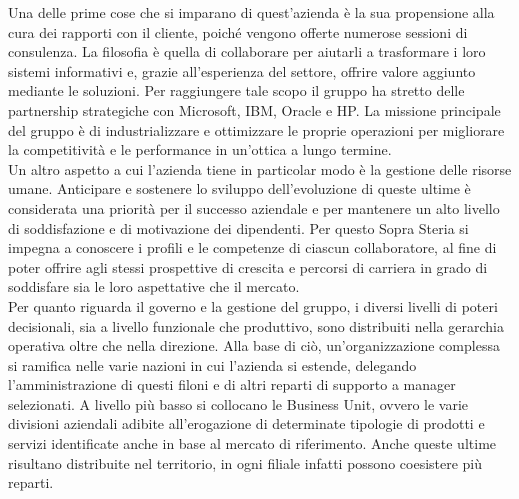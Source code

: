 	Una delle prime cose che si imparano di quest'azienda è la sua propensione alla cura dei rapporti con il cliente, poiché vengono offerte numerose sessioni	di consulenza. La filosofia è quella di collaborare per aiutarli a trasformare i loro sistemi informativi e, grazie all'esperienza del settore, offrire valore aggiunto mediante le soluzioni. Per raggiungere tale scopo il gruppo ha stretto delle partnership strategiche con Microsoft, IBM, Oracle e HP. La missione principale del gruppo è di industrializzare e ottimizzare le proprie operazioni per migliorare la competitività e le performance in un'ottica a lungo termine.\\
	
	Un altro aspetto a cui l'azienda tiene in particolar modo è la gestione delle risorse umane. Anticipare e sostenere lo sviluppo dell'evoluzione di queste ultime è considerata	una priorità per il successo aziendale e per mantenere un alto livello di soddisfazione e di motivazione dei dipendenti. Per questo Sopra Steria si impegna a conoscere i profili e le competenze di ciascun collaboratore, al fine di poter offrire agli stessi prospettive di crescita e percorsi di carriera in grado di soddisfare sia le loro aspettative che il mercato.\\
	
	
	Per quanto riguarda il governo e la gestione del gruppo, i diversi livelli di poteri decisionali, sia a livello funzionale che produttivo, sono distribuiti nella gerarchia operativa oltre che nella direzione. Alla base di ciò, un'organizzazione complessa si ramifica nelle varie nazioni in cui l'azienda si estende, delegando l'amministrazione di questi filoni e di altri reparti di supporto a manager selezionati. A livello più basso si collocano le Business Unit, ovvero le varie divisioni aziendali adibite all'erogazione di determinate tipologie di prodotti e servizi identificate anche in base al mercato di riferimento. Anche queste ultime risultano distribuite nel territorio, in ogni filiale infatti possono coesistere più reparti.\\
	
